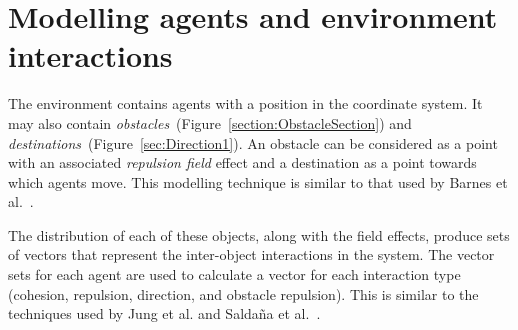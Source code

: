                                 

\section{Modelling agents and environment interactions}\label{method:AgentEnvironmentModel}
The environment contains agents with a position in the coordinate system. It may also contain \textit{obstacles}~(Figure~\ref{section:ObstacleSection}) and \textit{destinations}~(Figure~\ref{sec:Direction1}). An obstacle can be considered as a point with an associated \textit{repulsion field} effect and a destination as a point towards which agents move. This modelling technique is similar to that used by Barnes et al.~\cite{BAF:06, BAFVM:06}. 

The distribution of each of these objects, along with the field effects, produce sets of vectors that represent the inter-object interactions in the system. The vector sets for each agent are used to calculate a vector for each interaction type (cohesion, repulsion, direction, and obstacle repulsion). This is similar to the techniques used by Jung et al. and Salda\~na et al.~\cite{JG:13, SOM:12}. 

